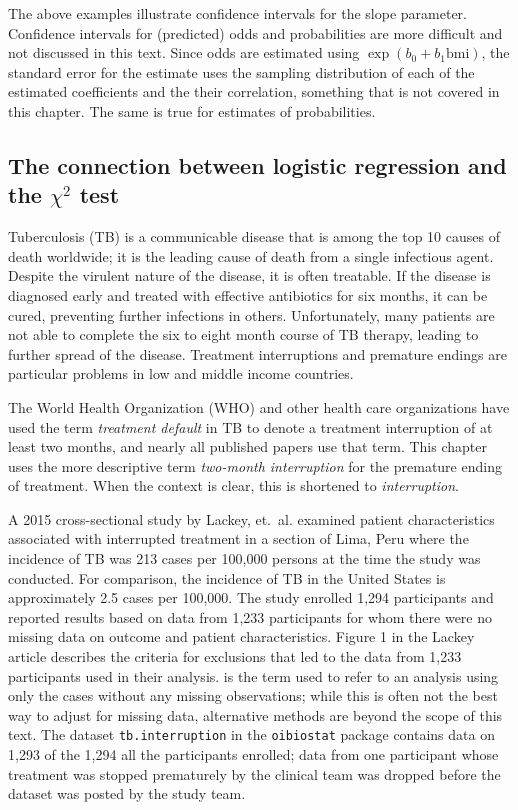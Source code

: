 The above examples illustrate confidence intervals for the slope parameter.  Confidence intervals for (predicted) odds and probabilities are more difficult and not discussed in this text.  Since odds are estimated using $\exp(b_0 + b_1 \textrm{bmi})$, the standard error for the estimate uses the sampling distribution of each of the estimated coefficients and the their correlation, something that is not covered in this chapter.  The same is true for estimates of probabilities.


\subsection{The connection between logistic regression and the $\chi^2$ test}\label{section:logisticChiSqTest}

Tuberculosis (TB) is a communicable disease that is among the top 10 causes of death worldwide; it is the leading cause of death from a single infectious agent.   Despite the virulent nature of the disease, it is often treatable.  If the disease is diagnosed early and treated with effective antibiotics for six months, it can be cured, preventing further infections in others. Unfortunately, many patients are not able to complete the six to eight month course of TB therapy, leading to further spread of the disease.  Treatment interruptions and premature endings are particular problems in low and middle income countries.

The World Health Organization (WHO) and other health care organizations have used the term \textit{treatment default} in TB to denote a treatment interruption of at least two months, and nearly all published papers use that term. This chapter uses the more descriptive term \textit{two-month interruption} for the premature ending of treatment.  When the context is clear, this is shortened to \textit{interruption}.

A 2015 cross-sectional study by Lackey, et.\ al.   examined patient characteristics associated with interrupted treatment in a section of Lima, Peru where the incidence of TB was 213 cases per 100,000 persons at the time the study was conducted. For comparison, the incidence of TB in the United States is approximately 2.5 cases per 100,000.   The study enrolled 1,294 participants and reported results based on data from 1,233 participants for whom there were no missing data on outcome and patient characteristics. Figure 1 in the Lackey article describes the criteria for exclusions that led to the data from 1,233 participants used in their analysis.  is the term used to refer to an analysis using only the cases without any missing observations; while this is often not the best way to adjust for missing data, alternative methods are beyond the scope of this text. The dataset \texttt{tb.interruption} in the \texttt{oibiostat} package contains data on 1,293 of the 1,294 all the participants enrolled; data from one participant whose treatment was stopped prematurely by the clinical team  was dropped before the dataset was posted by the study team.  


